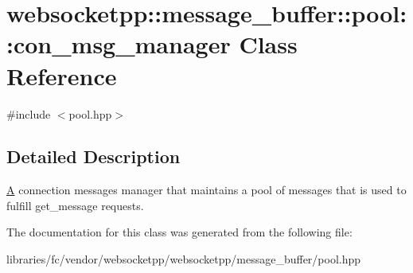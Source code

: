 \hypertarget{classwebsocketpp_1_1message__buffer_1_1pool_1_1con__msg__manager}{}\section{websocketpp\+:\+:message\+\_\+buffer\+:\+:pool\+:\+:con\+\_\+msg\+\_\+manager Class Reference}
\label{classwebsocketpp_1_1message__buffer_1_1pool_1_1con__msg__manager}


{\ttfamily \#include $<$pool.\+hpp$>$}



\subsection{Detailed Description}
\mbox{\hyperlink{struct_a}{A}} connection messages manager that maintains a pool of messages that is used to fulfill get\+\_\+message requests. 

The documentation for this class was generated from the following file\+:\begin{DoxyCompactItemize}
\item 
libraries/fc/vendor/websocketpp/websocketpp/message\+\_\+buffer/pool.\+hpp\end{DoxyCompactItemize}
